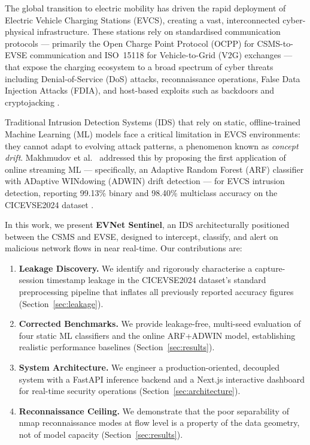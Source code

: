 \documentclass[conference]{IEEEtran}
\begin{document}
The global transition to electric mobility has driven the rapid deployment of Electric Vehicle Charging Stations (EVCS), creating a vast, interconnected cyber-physical infrastructure. These stations rely on standardised communication protocols --- primarily the Open Charge Point Protocol (OCPP) for CSMS-to-EVSE communication and ISO~15118 for Vehicle-to-Grid (V2G) exchanges --- that expose the charging ecosystem to a broad spectrum of cyber threats including Denial-of-Service (DoS) attacks, reconnaissance operations, False Data Injection Attacks (FDIA), and host-based exploits such as backdoors and cryptojacking \cite{b1,b3}.

Traditional Intrusion Detection Systems (IDS) that rely on static, offline-trained Machine Learning (ML) models face a critical limitation in EVCS environments: they cannot adapt to evolving attack patterns, a phenomenon known as \emph{concept drift}. Makhmudov et al.\ \cite{b4} addressed this by proposing the first application of online streaming ML --- specifically, an Adaptive Random Forest (ARF) classifier with ADaptive WINdowing (ADWIN) drift detection --- for EVCS intrusion detection, reporting 99.13\% binary and 98.40\% multiclass accuracy on the CICEVSE2024 dataset \cite{b4}.

In this work, we present \textbf{EVNet Sentinel}, an IDS architecturally positioned between the CSMS and EVSE, designed to intercept, classify, and alert on malicious network flows in near real-time. Our contributions are:

\begin{enumerate}
    \item \textbf{Leakage Discovery.} We identify and rigorously characterise a capture-session timestamp leakage in the CICEVSE2024 dataset's standard preprocessing pipeline that inflates all previously reported accuracy figures (Section~\ref{sec:leakage}).
    \item \textbf{Corrected Benchmarks.} We provide leakage-free, multi-seed evaluation of four static ML classifiers and the online ARF+ADWIN model, establishing realistic performance baselines (Section~\ref{sec:results}).
    \item \textbf{System Architecture.} We engineer a production-oriented, decoupled system with a FastAPI inference backend and a Next.js interactive dashboard for real-time security operations (Section~\ref{sec:architecture}).
    \item \textbf{Reconnaissance Ceiling.} We demonstrate that the poor separability of nmap reconnaissance modes at flow level is a property of the data geometry, not of model capacity (Section~\ref{sec:results}).
\end{enumerate}
\end{document}

